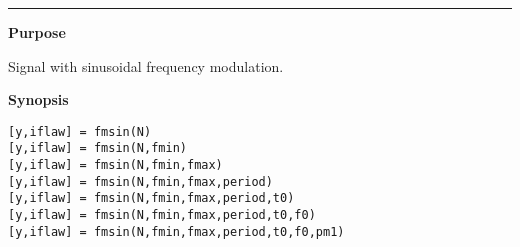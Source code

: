 


\hspace*{-1.6cm}{\Large \bf fmsin}

\vspace*{-.4cm}
\hspace*{-1.6cm}\rule[0in]{16.5cm}{.02cm}
\vspace*{.2cm}



{\bf \large {}\selectfont Purpose}\\
\hspace*{1.5cm}
\begin{minipage}[t]{13.5cm}
Signal with sinusoidal frequency modulation.
\end{minipage}
\vspace*{.5cm}


{\bf \large {}\selectfont Synopsis}\\
\hspace*{1.5cm}
\begin{minipage}[t]{13.5cm}
\begin{verbatim}
[y,iflaw] = fmsin(N)
[y,iflaw] = fmsin(N,fmin)
[y,iflaw] = fmsin(N,fmin,fmax)
[y,iflaw] = fmsin(N,fmin,fmax,period)
[y,iflaw] = fmsin(N,fmin,fmax,period,t0)
[y,iflaw] = fmsin(N,fmin,fmax,period,t0,f0)
[y,iflaw] = fmsin(N,fmin,fmax,period,t0,f0,pm1)
\end{verbatim}
\end{minipage}
\vspace*{.5cm}


